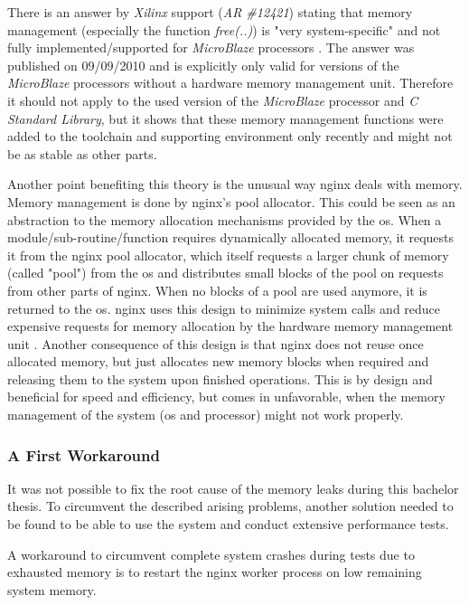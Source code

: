 There is an answer by \textit{Xilinx} support (\textit{AR \#12421}) stating that memory management (especially the function \textit{free(..)}) is "very system-specific" and not fully implemented/supported for \textit{MicroBlaze} processors \cite{mbfree}. The answer was published on 09/09/2010 and is explicitly only valid for versions of the \textit{MicroBlaze} processors without a hardware memory management unit. Therefore it should not apply to the used version of the \textit{MicroBlaze} processor and \textit{C Standard Library}, but it shows that these memory management functions were added to the toolchain and supporting environment only recently and might not be as stable as other parts.

Another point benefiting this theory is the unusual way nginx deals with memory. Memory management is done by nginx's pool allocator. This could be seen as an abstraction to the memory allocation mechanisms provided by the \gls{os}. When a module/sub-routine/function requires dynamically allocated memory, it requests it from the nginx pool allocator, which itself requests a larger chunk of memory (called "pool") from the \gls{os} and distributes small blocks of the pool on requests from other parts of nginx. When no blocks of a pool are used anymore, it is returned to the \gls{os}. nginx uses this design to minimize system calls and reduce expensive requests for memory allocation by the hardware memory management unit \cite{aosa}. Another consequence of this design is that nginx does not reuse once allocated memory, but just allocates new memory blocks when required and releasing them to the system upon finished operations. This is by design and beneficial for speed and efficiency, but comes in unfavorable, when the memory management of the system (\gls{os} and processor) might not work properly.

\subsubsection{A First Workaround}

It was not possible to fix the root cause of the memory leaks during this bachelor thesis. To circumvent the described arising problems, another solution needed to be found to be able to use the system and conduct extensive performance tests.

A workaround to circumvent complete system crashes during tests due to exhausted memory is to restart the nginx worker process on low remaining system memory.

